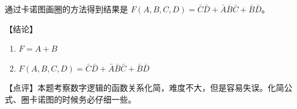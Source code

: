 \documentclass[UTF8]{ctexart}
\begin{document}
通过卡诺图画圈的方法得到结果是 $F(A,B,C,D) = \bar{C}\bar{D} + \bar{A}\bar{B}\bar{C} + \bar{B}\bar{D}$。

\vspace{1em}
\textcolor{cyan!80!black}{【结论】
\begin{enumerate}
    \item $F=A+B$
    \item $F(A,B,C,D) = \bar{C}\bar{D} + \bar{A}\bar{B}\bar{C} + \bar{B}\bar{D}$
\end{enumerate}
}

\textcolor{cyan!80!black}{【点评】本题考察数字逻辑的函数关系化简，难度不大，但是容易失误。化简公式、圈卡诺图的时候务必仔细一些。}
\end{document}
